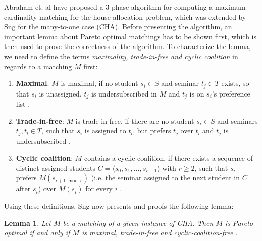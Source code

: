 Abraham et. al \cite{Abraham:Pacha} have proposed a 3-phase algorithm for computing a maximum cardinality matching for the house allocation problem, which was extended by Sng \cite{SngThesis} for the many-to-one case (CHA). Before presenting the algorithm, an important lemma about Pareto optimal matchings has to be shown first, which is then used to prove the correctness of the algorithm. To characterize the lemma, we need to define the terms \emph{maximality, trade-in-free and cyclic coalition} in regards to a matching $M$ first: 
\begin{enumerate}
    \item \textbf{Maximal}: $M$ is maximal, if no student $s_i \in S$ and seminar $t_j \in T$ exists, so that $s_i$ is unassigned, $t_j$ is undersubscribed in $M$ and $t_j$ is on $s_i$'s preference list \cite{Abraham:Pacha}.
    \item \textbf{Trade-in-free}: $M$ is trade-in-free, if there are no student $s_i \in S$ and seminars $t_j, t_l \in T$, such that $s_i$ is assigned to $t_l$, but prefers $t_j$ over $t_l$ and $t_j$ is undersubscribed \cite{Abraham:Pacha}. 
    \item \textbf{Cyclic coalition}: $M$ contains a cyclic coalition, if there exists a sequence of distinct assigned students $C = \langle s_0, s_1, \dots, s_{r-1} \rangle$ with $r \geq 2$, such that $s_i$ prefers $M(s_{i + 1 \bmod r})$ (i.e. the seminar assigned to the next student in $C$ after $s_i$) over $M(s_i)$ for every $i$ \cite{Abraham:Pacha}.
\end{enumerate}
Using these definitions, Sng now presents and proofs the following lemma:
\newtheorem{lemma}[theorem]{Lemma}
\begin{lemma}\label{lemma-pacha}
    Let $M$ be a matching of a given instance of CHA. Then $M$ is Pareto optimal if and only if $M$ is maximal, trade-in-free and cyclic-coalition-free \cite{Abraham:Pacha}.
\end{lemma}

